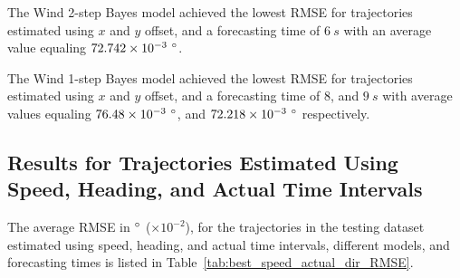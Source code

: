 \documentclass[preprint,12pt]{elsarticle}
\begin{document}
The Wind 2-step Bayes model achieved the lowest RMSE for trajectories estimated using $x$ and $y$ offset, and a forecasting time of $6 \ s$ with an average value equaling $72.742 \times 10^{-3} \ \degree$.

The Wind 1-step Bayes model achieved the lowest RMSE for trajectories estimated using $x$ and $y$ offset, and a forecasting time of $8$, and $9 \ s$ with average values equaling $76.48 \times 10^{-3} \ \degree$, and $72.218 \times 10^{-3} \ \degree$ respectively.

\subsection{Results for Trajectories Estimated Using Speed, Heading, and Actual Time Intervals}

The average RMSE in $\degree$ ($\times 10^{-2}$), for the trajectories in the testing dataset estimated using speed, heading, and actual time intervals, different models, and forecasting times is listed in Table~\ref{tab:best_speed_actual_dir_RMSE}.
\end{document}
